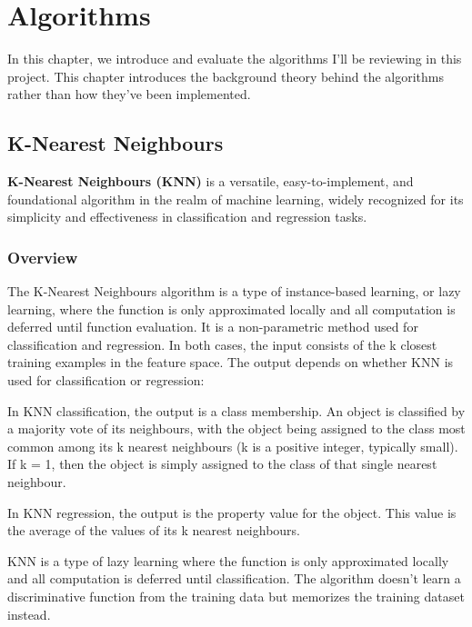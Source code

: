 \documentclass[letterpaper,10pt]{article}
\begin{document}
\section{Algorithms} \label{withinscopestart}
In this chapter, we introduce and evaluate the algorithms I'll be reviewing in this project. This chapter introduces the background theory behind the algorithms rather than how they've been implemented. 
\subsection{K-Nearest Neighbours}
\textbf{K-Nearest Neighbours (KNN)} is a versatile, easy-to-implement, and foundational algorithm in the realm of machine learning, widely recognized for its simplicity and effectiveness in classification and regression tasks.
\subsubsection{Overview}
The K-Nearest Neighbours algorithm is a type of instance-based learning, or lazy learning, where the function is only approximated locally and all computation is deferred until function evaluation. It is a non-parametric method used for classification and regression. In both cases, the input consists of the k closest training examples in the feature space. The output depends on whether KNN is used for classification or regression: \par

In KNN classification, the output is a class membership. An object is classified by a majority vote of its neighbours, with the object being assigned to the class most common among its k nearest neighbours (k is a positive integer, typically small). If k = 1, then the object is simply assigned to the class of that single nearest neighbour. \par
In KNN regression, the output is the property value for the object. This value is the average of the values of its k nearest neighbours. \par
KNN is a type of lazy learning where the function is only approximated locally and all computation is deferred until classification. The algorithm doesn't learn a discriminative function from the training data but memorizes the training dataset instead.
\end{document}
